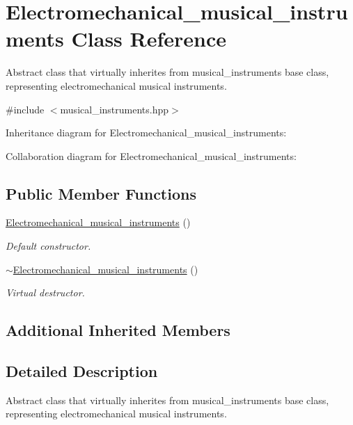\hypertarget{classElectromechanical__musical__instruments}{}\section{Electromechanical\+\_\+musical\+\_\+instruments Class Reference}
\label{classElectromechanical__musical__instruments}


Abstract class that virtually inherites from musical\+\_\+instruments base class, representing electromechanical musical instruments.  




{\ttfamily \#include $<$musical\+\_\+instruments.\+hpp$>$}



Inheritance diagram for Electromechanical\+\_\+musical\+\_\+instruments\+:


Collaboration diagram for Electromechanical\+\_\+musical\+\_\+instruments\+:
\subsection*{Public Member Functions}
\begin{DoxyCompactItemize}
\item 
\hyperlink{classElectromechanical__musical__instruments_a8060f1a87acad3b81bfc92b53abb6936}{Electromechanical\+\_\+musical\+\_\+instruments} ()
\begin{DoxyCompactList}\small\item\em Default constructor. \end{DoxyCompactList}\item 
\hyperlink{classElectromechanical__musical__instruments_af884e266ac791c429221b6ce0ca50f47}{$\sim$\+Electromechanical\+\_\+musical\+\_\+instruments} ()
\begin{DoxyCompactList}\small\item\em Virtual destructor. \end{DoxyCompactList}\end{DoxyCompactItemize}
\subsection*{Additional Inherited Members}


\subsection{Detailed Description}
Abstract class that virtually inherites from musical\+\_\+instruments base class, representing electromechanical musical instruments. 

